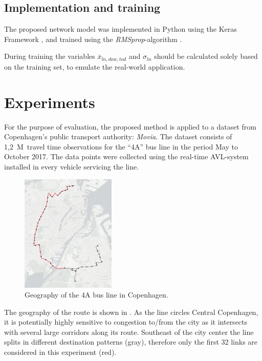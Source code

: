 \documentclass[preprint,11pt,5p,twocolumn]{elsarticle}
\begin{document}
\subsection{Implementation and training}
The proposed network model was implemented in Python using the Keras Framework \cite{Keras}, and trained using the \emph{RMSprop}-algorithm \cite{RMSprop}.

During training the variables $\mathit{\bar{x}_{\mathit{ln},\mathit{dow},\mathit{tod}}}$ and $\sigma_\mathit{ln}$ should be calculated solely based on the training set, to emulate the real-world application.

\section{Experiments}
\label{sec:experiments}

For the purpose of evaluation, the proposed method is applied to a dataset from Copenhagen's public transport authority: \emph{Movia}. The dataset consists of 1,2~M~travel time observations for the ``4A'' bus line in the period May to October 2017. The data points were collected using the real-time AVL-system installed in every vehicle servicing the line. 

\begin{figure}[!ht]
  \centering
  \includegraphics[width=0.4\textwidth]{drawings/map.png}
  \caption{Geography of the 4A bus line in Copenhagen.}
  \label{fig:4a_map}
\end{figure}

The geography of the route is shown in . As the line circles Central Copenhagen, it is potentially highly sensitive to congestion to/from the city as it intersects with several large corridors along its route. Southeast of the city center the line splits in different destination patterns (gray), therefore only the first 32 links are considered in this experiment (red).
\end{document}
